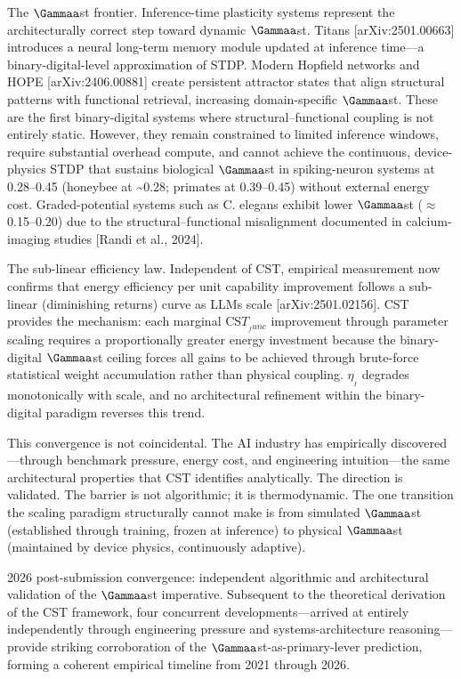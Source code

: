 \documentclass[a4paper,12pt]{article}
\begin{document}
The $\Gammaa$st frontier. Inference-time plasticity systems represent the architecturally correct step toward dynamic $\Gammaa$st. Titans [arXiv:2501.00663] introduces a neural long-term memory module updated at inference time---a binary-digital-level approximation of STDP. Modern Hopfield networks and HOPE [arXiv:2406.00881] create persistent attractor states that align structural patterns with functional retrieval, increasing domain-specific $\Gammaa$st. These are the first binary-digital systems where structural--functional coupling is not entirely static. However, they remain constrained to limited inference windows, require substantial overhead compute, and cannot achieve the continuous, device-physics STDP that sustains biological $\Gammaa$st in spiking-neuron systems at 0.28--0.45 (honeybee at \textasciitilde{}0.28; primates at 0.39--0.45) without external energy cost. Graded-potential systems such as C. elegans exhibit lower $\Gammaa$st ($\approx$ 0.15--0.20) due to the structural--functional misalignment documented in calcium-imaging studies [Randi et al., 2024].


The sub-linear efficiency law. Independent of CST, empirical measurement now confirms that energy efficiency per unit capability improvement follows a sub-linear (diminishing returns) curve as LLMs scale [arXiv:2501.02156]. CST provides the mechanism: each marginal CS$T_{_func}$ improvement through parameter scaling requires a proportionally greater energy investment because the binary-digital $\Gammaa$st ceiling forces all gains to be achieved through brute-force statistical weight accumulation rather than physical coupling. $\eta_{_I}$ degrades monotonically with scale, and no architectural refinement within the binary-digital paradigm reverses this trend.


This convergence is not coincidental. The AI industry has empirically discovered---through benchmark pressure, energy cost, and engineering intuition---the same architectural properties that CST identifies analytically. The direction is validated. The barrier is not algorithmic; it is thermodynamic. The one transition the scaling paradigm structurally cannot make is from simulated $\Gammaa$st (established through training, frozen at inference) to physical $\Gammaa$st (maintained by device physics, continuously adaptive).


2026 post-submission convergence: independent algorithmic and architectural validation of the $\Gammaa$st imperative. Subsequent to the theoretical derivation of the CST framework, four concurrent developments---arrived at entirely independently through engineering pressure and systems-architecture reasoning---provide striking corroboration of the $\Gammaa$st-as-primary-lever prediction, forming a coherent empirical timeline from 2021 through 2026.
\end{document}
